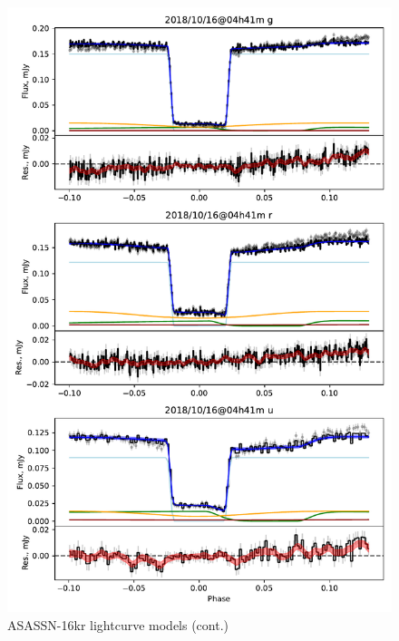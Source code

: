 \begin{figure}
    \centering
    \includegraphics[width=\textwidth]{figures/results/three_cvs_with_weird_colours/ASASSN-16kr/ASASSN-16kr_2.pdf}
    \caption{ASASSN-16kr lightcurve models (cont.)}
    \label{fig:ASASSN-16kr all lightcurves cont 1}
\end{figure}
